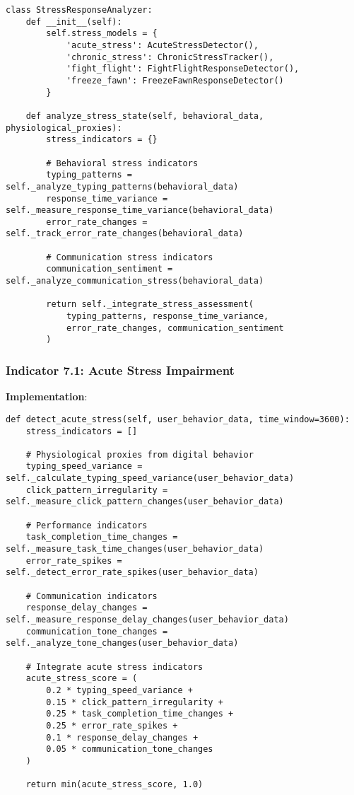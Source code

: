 \documentclass[11pt, onecolumn]{article}
\begin{document}
\begin{lstlisting}
class StressResponseAnalyzer:
    def __init__(self):
        self.stress_models = {
            'acute_stress': AcuteStressDetector(),
            'chronic_stress': ChronicStressTracker(),
            'fight_flight': FightFlightResponseDetector(),
            'freeze_fawn': FreezeFawnResponseDetector()
        }
        
    def analyze_stress_state(self, behavioral_data, physiological_proxies):
        stress_indicators = {}
        
        # Behavioral stress indicators
        typing_patterns = self._analyze_typing_patterns(behavioral_data)
        response_time_variance = self._measure_response_time_variance(behavioral_data)
        error_rate_changes = self._track_error_rate_changes(behavioral_data)
        
        # Communication stress indicators
        communication_sentiment = self._analyze_communication_stress(behavioral_data)
        
        return self._integrate_stress_assessment(
            typing_patterns, response_time_variance, 
            error_rate_changes, communication_sentiment
        )
\end{lstlisting}

\subsubsection{Indicator 7.1: Acute Stress Impairment}

\textbf{Implementation}:

\begin{lstlisting}
def detect_acute_stress(self, user_behavior_data, time_window=3600):
    stress_indicators = []
    
    # Physiological proxies from digital behavior
    typing_speed_variance = self._calculate_typing_speed_variance(user_behavior_data)
    click_pattern_irregularity = self._measure_click_pattern_changes(user_behavior_data)
    
    # Performance indicators
    task_completion_time_changes = self._measure_task_time_changes(user_behavior_data)
    error_rate_spikes = self._detect_error_rate_spikes(user_behavior_data)
    
    # Communication indicators
    response_delay_changes = self._measure_response_delay_changes(user_behavior_data)
    communication_tone_changes = self._analyze_tone_changes(user_behavior_data)
    
    # Integrate acute stress indicators
    acute_stress_score = (
        0.2 * typing_speed_variance +
        0.15 * click_pattern_irregularity +
        0.25 * task_completion_time_changes +
        0.25 * error_rate_spikes +
        0.1 * response_delay_changes +
        0.05 * communication_tone_changes
    )
    
    return min(acute_stress_score, 1.0)
\end{lstlisting}
\end{document}
